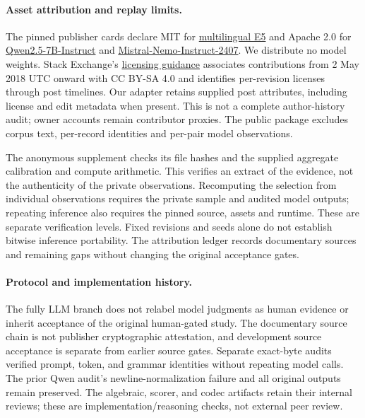 \paragraph{Asset attribution and replay limits.}
The pinned publisher cards declare MIT for
\href{https://huggingface.co/intfloat/multilingual-e5-base/blob/d128750597153bb5987e10b1c3493a34e5a4502a/README.md}{multilingual E5}
and Apache 2.0 for
\href{https://huggingface.co/Qwen/Qwen2.5-7B-Instruct/blob/a09a35458c702b33eeacc393d103063234e8bc28/README.md}{Qwen2.5-7B-Instruct}
and \href{https://huggingface.co/mistralai/Mistral-Nemo-Instruct-2407/blob/04d8a90549d23fc6bd7f642064003592df51e9b3/README.md}{Mistral-Nemo-Instruct-2407}.
We distribute no model weights. Stack Exchange's
\href{https://stackoverflow.com/help/licensing}{licensing guidance}
associates contributions from 2 May 2018 UTC onward with CC BY-SA 4.0
and identifies per-revision licenses through post timelines.
Our adapter retains supplied post attributes, including license and edit
metadata when present. This is not a complete author-history audit;
owner accounts remain contributor proxies. The public package excludes
corpus text, per-record identities and per-pair model observations.

The anonymous supplement checks its file hashes and the supplied aggregate
calibration and compute arithmetic. This verifies an extract of the evidence,
not the authenticity of the private observations. Recomputing the selection from individual observations
requires the private sample and audited model outputs; repeating inference
also requires the pinned source, assets and runtime. These are separate
verification levels. Fixed revisions and seeds alone do not establish
bitwise inference portability. The attribution ledger records documentary
sources and remaining gaps without changing the original acceptance gates.

\paragraph{Protocol and implementation history.}
The fully LLM branch does not relabel model judgments as human evidence or
inherit acceptance of the original human-gated study. The documentary
source chain is not publisher cryptographic attestation, and development
source acceptance is separate from earlier source gates.
Separate exact-byte audits verified prompt, token, and grammar identities
without repeating model calls. The prior Qwen audit's newline-normalization
failure and all original outputs remain preserved.
The algebraic, scorer, and codec artifacts retain their internal reviews;
these are implementation/reasoning checks, not external peer review.

